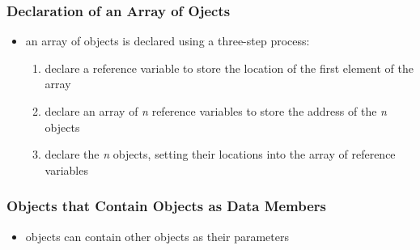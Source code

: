\documentclass[11pt]{article}
\begin{document}
\subsubsection{Declaration of an Array of Ojects}
\label{sec:org9233bde}
\begin{itemize}
\item an array of objects is declared using a three-step process:
\begin{enumerate}
\item declare a reference variable to store the location of the first element of the array
\item declare an array of \emph{n} reference variables to store the address of the \emph{n} objects
\item declare the \emph{n} objects, setting their locations into the array of reference variables
\end{enumerate}
\end{itemize}
\subsubsection{Objects that Contain Objects as Data Members}
\label{sec:orgbd53cc0}
\begin{itemize}
\item objects can contain other objects as their parameters
\end{itemize}
\end{document}
